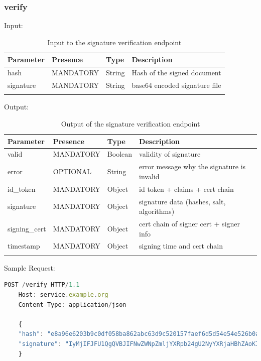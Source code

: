 \subsubsection{verify}
Input:

\begin{longtable}{|l|l|l|l|}
    \hline
    \textbf{Parameter} & \textbf{Presence} & \textbf{Type} & \textbf{Description} \\ \hline
    hash & MANDATORY & String & Hash of the signed document \\ \hline
    signature & MANDATORY & String & base64 encoded signature file \\ \hline
    \caption{Input to the signature verification endpoint}
\end{longtable}

Output:

\begin{longtable}{|l|l|l|l|}
    \hline
    \textbf{Parameter} & \textbf{Presence} & \textbf{Type} & \textbf{Description} \\ \hline
    valid & MANDATORY & Boolean & validity of signature \\ \hline
    error & OPTIONAL & String & error message why the signature is invalid \\ \hline
    id\_token & MANDATORY & Object & id token + claims + cert chain \\ \hline
    signature & MANDATORY & Object & signature data (hashes, salt, algorithms) \\ \hline
    signing\_cert & MANDATORY & Object & cert chain of signer cert + signer info \\ \hline
    timestamp & MANDATORY & Object & signing time and cert chain \\ \hline
    \caption{Output of the signature verification endpoint}
\end{longtable}

Sample Request:
\begin{lstlisting}[caption={sign request}, captionpos=b, language=JavaScript, label={lst:verifyrequest}]
    POST /verify HTTP/1.1
    Host: service.example.org
    Content-Type: application/json

    {
    "hash": "e8a96e6203b9c0df058ba862abc63d9c520157faef6d5d54e54e526b0a85b2be",
    "signature": "IyMjIFJFU1QgQVBJIFNwZWNpZmljYXRpb24gU2NyYXRjaHBhZAoKIyMjIyBQcmUtQXV0aCBlbmRw...b2ludCAKIyMjIyMgRW5kcG9pbnQKYGBgUE9TVCAvYXBpL3YxL3NpZ25gYGAK"
    }
\end{lstlisting}

